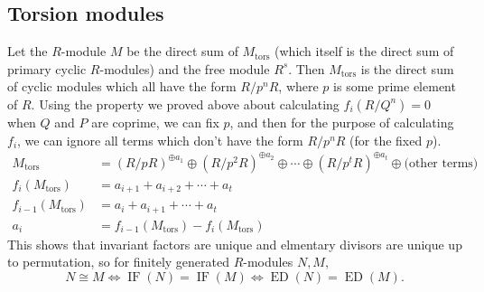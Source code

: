 \documentclass[12pt]{article}
\begin{document}
\subsection{Torsion modules}
Let the $R$-module $M$ be the direct sum of $M_\mathrm{tors}$ (which itself is the direct sum of primary cyclic $R$-modules) and the free module $R^s$. Then $M_\mathrm{tors}$ is the direct sum of cyclic modules which all have the form $R/p^nR$, where $p$ is some prime element of $R$. Using the property we proved above about calculating $f_i(R/Q^n)=0$ when $Q$ and $P$ are coprime, we can fix $p$, and then for the purpose of calculating $f_i$, we can ignore all terms which don't have the form $R/p^nR$ (for the fixed $p$).
\begin{align*}
    M_\mathrm{tors} &= (R/pR)^{\oplus a_1} \oplus (R/p^2R)^{\oplus a_2} \oplus \cdots \oplus (R/p^tR)^{\oplus a_t} \oplus \text{(other terms)} \\
    f_i(M_\mathrm{tors}) &= a_{i+1} + a_{i+2} + \cdots + a_t \\
    f_{i-1}(M_\mathrm{tors}) &= a_{i} + a_{i+1} + \cdots + a_t \\
    a_i &= f_{i-1}(M_\mathrm{tors}) - f_i(M_\mathrm{tors})
\end{align*}
This shows that invariant factors are unique and elmentary divisors are unique up to permutation, so for finitely generated $R$-modules $N,M$,
\[ N \cong M \iff \operatorname{IF}(N)= \operatorname{IF}(M) \iff \operatorname{ED}(N)= \operatorname{ED}(M). \]
\end{document}
